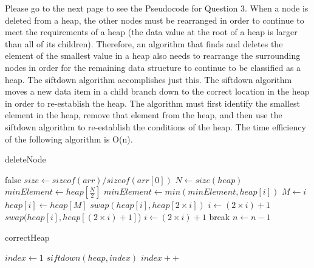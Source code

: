 \documentclass{article}
\begin{document}
Please go to the next page to see the Pseudocode for Question 3.
When a node is deleted from a heap, the other nodes must be rearranged in order to continue to meet the requirements of a heap (the data value at the root of a heap is larger than all of its children). Therefore, an algorithm that finds and deletes the element of the smallest value in a heap also needs to rearrange the surrounding nodes in order for the remaining data structure to continue to be classified as a heap. The siftdown algorithm accomplishes just this. The siftdown algorithm moves a new data item in a child branch down to the correct location in the heap in order to re-establish the heap. The algorithm must first identify the smallest element in the heap, remove that element from the heap, and then use the siftdown algorithm to re-establish the conditions of the heap. The time efficiency of the following algorithm is O(n).   
\begin{algorithm}
\caption{deleteNode}\label{alg:cap}
\begin{algorithmic}
\State \Return false
\Else
\State $size \gets sizeof(arr) / sizeof(arr[0])$
\State $N \gets size(heap)$
\State $minElement \gets heap[\frac{N}{2}]$
\State $minElement \gets min(minElement, heap[i])$
\EndFor
{}
\State $M \gets i$
\State $heap[i] \gets heap[M]$
\EndIf
\EndFor
{}
\State $swap(heap[i], heap[2 \times i])$
\State $i \gets (2 \times i)+1$
\State $swap(heap[i], heap[(2 \times i)+1]$)
\State $i \gets (2 \times i)+1$
\Else
\State break
\EndIf
\EndFor
\State $n \gets n-1$
\EndIf
\end{algorithmic}
\end{algorithm}

\begin{algorithm}
\caption{correctHeap}\label{alg:cap}
\begin{algorithmic}
\State $index \gets 1$
\State $siftdown(heap, index)$
\State $index++$
\EndWhile
\end{algorithmic}
\end{algorithm}
\end{document}
